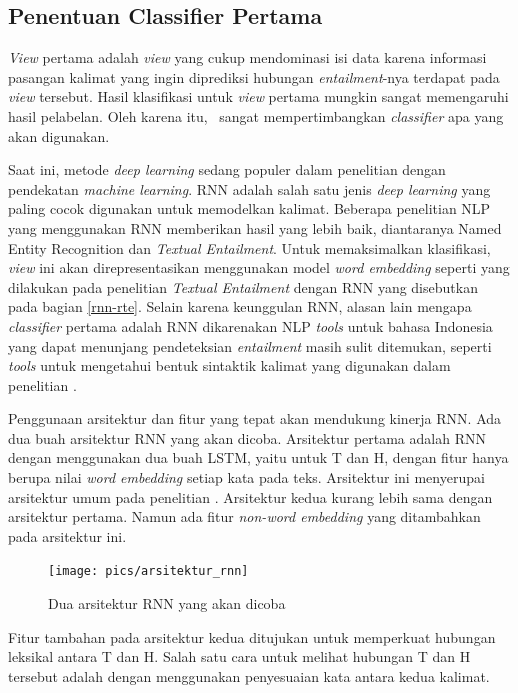 	\subsection{Penentuan Classifier Pertama}
	\textit{View} pertama adalah \textit{view} yang cukup mendominasi isi data karena informasi pasangan kalimat yang ingin diprediksi hubungan \textit{entailment}-nya terdapat pada \textit{view} tersebut. Hasil klasifikasi untuk \textit{view} pertama mungkin sangat memengaruhi hasil pelabelan. Oleh karena itu, \saya~sangat mempertimbangkan \textit{classifier} apa yang akan digunakan.
	
	Saat ini, metode \textit{deep learning} sedang populer dalam penelitian dengan pendekatan \textit{machine learning}. RNN adalah salah satu jenis \textit{deep learning} yang paling cocok digunakan untuk memodelkan kalimat. Beberapa penelitian NLP yang menggunakan RNN memberikan hasil yang lebih baik, diantaranya Named Entity Recognition \citep{Hammerton:2003:CONLL} dan \textit{Textual Entailment}. Untuk memaksimalkan klasifikasi, \textit{view} ini akan direpresentasikan menggunakan model \textit{word embedding} seperti yang dilakukan pada penelitian \textit{Textual Entailment} dengan RNN yang disebutkan pada bagian \ref{rnn-rte}. Selain karena keunggulan RNN, alasan lain mengapa \textit{classifier} pertama adalah RNN dikarenakan NLP \textit{tools} untuk bahasa Indonesia yang dapat menunjang pendeteksian \textit{entailment} masih sulit ditemukan, seperti \textit{tools} untuk mengetahui bentuk sintaktik kalimat yang digunakan dalam penelitian \cite{zanzottoRTEexpand}.
	
	Penggunaan arsitektur dan fitur yang tepat akan mendukung kinerja RNN. Ada dua buah arsitektur RNN yang akan dicoba. Arsitektur pertama adalah RNN dengan menggunakan dua buah LSTM, yaitu untuk T dan H, dengan fitur hanya berupa nilai \textit{word embedding} setiap kata pada teks. Arsitektur ini menyerupai arsitektur umum pada penelitian \cite{snli:emnlp2015}. Arsitektur kedua kurang lebih sama dengan arsitektur pertama. Namun ada fitur \textit{non-word embedding} yang ditambahkan pada arsitektur ini. 
	\begin{figure}
		\centering
		\texttt{[image: pics/arsitektur\_rnn]}
		\caption{Dua arsitektur RNN yang akan dicoba}
		\label{fig:arsitektur_rnn}
	\end{figure}
	Fitur tambahan pada arsitektur kedua ditujukan untuk memperkuat hubungan leksikal antara T dan H. Salah satu cara untuk melihat hubungan T dan H tersebut adalah dengan menggunakan penyesuaian kata antara kedua kalimat.
	
